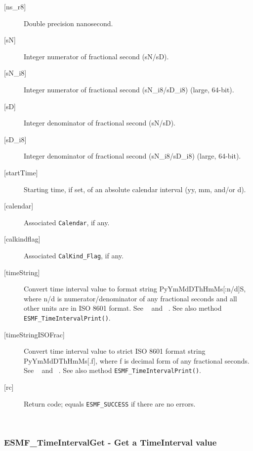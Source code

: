 \begin{description}
       \item[{[ns\_r8]}]
            Double precision nanosecond.
       \item[{[sN]}]
            Integer numerator of fractional second (sN/sD).
       \item[{[sN\_i8]}]
            Integer numerator of fractional second (sN\_i8/sD\_i8)
                                                             (large, 64-bit). 
       \item[{[sD]}]
            Integer denominator of fractional second (sN/sD).
       \item[{[sD\_i8]}]
            Integer denominator of fractional second (sN\_i8/sD\_i8)
                                                             (large, 64-bit). 
       \item[{[startTime]}]
            Starting time, if set, of an absolute calendar interval
            (yy, mm, and/or d).
       \item[{[calendar]}]
            Associated {\tt Calendar}, if any.
       \item[{[calkindflag]}]
            Associated {\tt CalKind\_Flag}, if any.
       \item[[{timeString]}]
            \begin{sloppypar}
            Convert time interval value to format string PyYmMdDThHmMs[:n/d]S,
            where n/d is numerator/denominator of any fractional seconds and
            all other units are in ISO 8601 format.  See ~\cite{ISO} and
            ~\cite{ISOnotes}.  See also method {\tt ESMF\_TimeIntervalPrint()}.
            \end{sloppypar}
       \item[{[timeStringISOFrac]}]
            Convert time interval value to strict ISO 8601 format string
            PyYmMdDThHmMs[.f], where f is decimal form of any fractional
            seconds.  See ~\cite{ISO} and ~\cite{ISOnotes}. See also method
            {\tt ESMF\_TimeIntervalPrint()}.
       \item[{[rc]}]
            Return code; equals {\tt ESMF\_SUCCESS} if there are no errors.
       \end{description}
   
 
\mbox{}\hrulefill\ 
 
\subsubsection [ESMF\_TimeIntervalGet] {ESMF\_TimeIntervalGet - Get a TimeInterval value }


